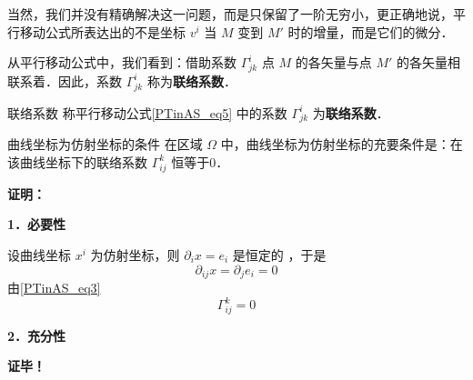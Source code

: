 当然，我们并没有精确解决这一问题，而是只保留了一阶无穷小，更正确地说，平行移动公式所表达出的不是坐标 $v^i$ 当 $M$ 变到 $M'$ 时的增量，而是它们的微分．

从平行移动公式中，我们看到：借助系数 $\Gamma^i_{jk}$ 点 $M$ 的各矢量与点 $M'$ 的各矢量相联系着．因此，系数 $\Gamma^i_{jk}$ 称为\textbf{联络系数}．
\begin{definition}{联络系数}
称平行移动公式\autoref{PTinAS_eq5} 中的系数 $\Gamma^i_{jk}$ 为\textbf{联络系数}．
\end{definition}
\begin{theorem}{曲线坐标为仿射坐标的条件}
在区域 $\Omega$ 中，曲线坐标为仿射坐标的充要条件是：在该曲线坐标下的联络系数 $\Gamma^k_{ij}$ 恒等于0．
\end{theorem}
\textbf{证明：}

\textbf{1．必要性}

设曲线坐标 $x^i$ 为仿射坐标，则 $\partial_i x=e_i$ 是恒定的 ，于是
\begin{equation}
\partial_{ij} x=\partial_j e_i=0
\end{equation}
由\autoref{PTinAS_eq3} 
\begin{equation}
\Gamma^k_{ij}=0
\end{equation}

\textbf{2．充分性}


\textbf{证毕！}